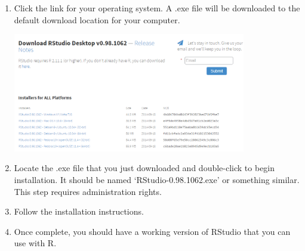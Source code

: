 \documentclass[letterpaper,12pt]{article}\usepackage[]{graphicx}\usepackage[]{color}
\begin{document}
\begin{enumerate}
\item{Click the link for your operating system.  A .exe file will be downloaded to the default download location for your computer.}

\includegraphics[width=0.8\textwidth]{figs/installosrstudio.png}

\item{Locate the .exe file that you just downloaded and double-click to begin installation.  It should be named `RStudio-0.98.1062.exe' or something similar.  This step requires administration rights.}

\item{Follow the installation instructions.}

\item{Once complete, you should have a working version of RStudio that you can use with R.}

\end{enumerate}
\end{document}
